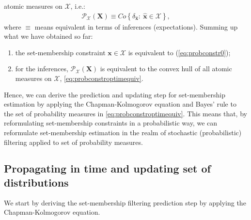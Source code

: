 \documentclass[twocolumn]{autart}
\begin{document}
atomic measures on $\mathcal{X}$, i.e.:
 \begin{equation}
\label{eq:probconstroptimequiv}
\begin{array}{l}
\mathcal{P}_{\mathcal{X}}(\mathbf{X})\equiv Co\left\{\delta_{\hat{\mathbf{x}}}:~\hat{\mathbf{x}}\in  \mathcal{X}\right\},
 \end{array}
\end{equation}
where $\equiv$ means equivalent in terms of inferences (expectations).
Summing up what we have obtained so far:
\begin{enumerate}
 \item the set-membership constraint $\mathbf{x} \in \mathcal{X}$  is equivalent to (\ref{eq:probconstr0});
 \item for the inferences, $\mathcal{P}_{\mathcal{X}}(\mathbf{X})$ is equivalent to the convex hull of all atomic measures on $\mathcal{X}$, \eqref{eq:probconstroptimequiv}.
\end{enumerate}
Hence, we can derive the prediction and updating step for set-membership estimation by applying  the
Chapman-Kolmogorov equation and Bayes' rule to the set of probability measures  in  \eqref{eq:probconstroptimequiv}.
This means that, by reformulating set-membership constraints in a probabilistic way, we can reformulate set-membership estimation in the realm of stochastic (probabilistic) filtering applied to set of probability measures.




\subsection{Propagating in time and updating  set of distributions}
We start by deriving the set-membership filtering prediction step by applying  the
Chapman-Kolmogorov equation.
\end{document}
